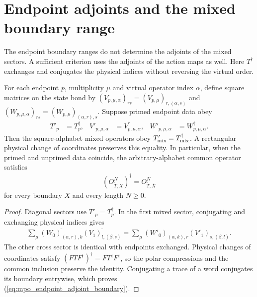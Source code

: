 \section{Endpoint adjoints and the mixed boundary range}

The endpoint boundary ranges do not determine the adjoints of the mixed
sectors. A sufficient criterion uses the adjoints of the action maps
as well. Here $T^\dagger$ exchanges and conjugates the physical indices
without reversing the virtual order.

\begin{lemma}
    \label{lem:mpo_mixed_endpoint_adjoint}
    \leanok
    For each endpoint $p$, multiplicity $\mu$ and virtual operator
    index $\alpha$, define square matrices on the state bond by
    $(V_{p,\mu,\alpha})_{rs}=(V_{p,\mu})_{r,(\alpha,s)}$ and
    $(W_{p,\mu,\alpha})_{rs}=(W_{p,\mu})_{(\alpha,r),s}$.
    Suppose primed endpoint data obey
    \begin{align}
        T'_p              & =T_p^\dagger,              &
        V'_{p,\mu,\alpha} & =V_{p,\mu,\alpha}^\dagger, &
        W'_{p,\mu,\alpha} & =W_{p,\mu,\alpha}^\dagger.
        \label{eq:mpo_endpoint_adjoint_data}
    \end{align}
    Then the square-alphabet mixed operators obey $T'_{\rm mix}=T_{\rm mix}^\dagger$.
    A rectangular physical change of coordinates preserves this equality.
    In particular, when the primed and unprimed data coincide, the
    arbitrary-alphabet common operator satisfies
    \begin{align}
        (O^N_{\widetilde T,X})^\dagger
        =O^N_{\widetilde T,\overline X}
        \label{eq:mpo_endpoint_adjoint_boundary}
    \end{align}
    for every boundary $X$ and every length $N\geq0$.
\end{lemma}
\begin{proof}
    \leanok
    Diagonal sectors use $T'_p=T_p^\dagger$. In the first mixed sector,
    conjugating and exchanging physical indices gives
    \begin{align}
        \sum_\mu\overline{(W_0)_{(\alpha,r),k}}
        \overline{(V_1)_{l,(\beta,s)}}
        =\sum_\mu(W'_0)_{(\alpha,k),r}(V'_1)_{s,(\beta,l)}.
        \label{eq:mpo_endpoint_adjoint_cross}
    \end{align}
    The other cross sector is identical with endpoints exchanged.
    Physical changes of coordinates satisfy
    $(FTF^\dagger)^\dagger=FT^\dagger F^\dagger$, so the polar
    compressions and the common inclusion preserve the identity.
    Conjugating a trace of a word conjugates its boundary entrywise,
    which proves (\ref{eq:mpo_endpoint_adjoint_boundary}).
\end{proof}

